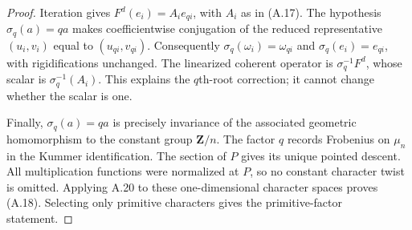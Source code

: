 \documentclass[11pt]{article}
\begin{document}
\begin{proof}
Iteration gives $F^d(e_i)=A_i e_{qi}$, with $A_i$ as in (A.17).
The hypothesis $\sigma_q(a)=qa$ makes coefficientwise conjugation
of the reduced representative $(u_i,v_i)$ equal to $(u_{qi},v_{qi})$.
Consequently $\sigma_q(\omega_i)=\omega_{qi}$ and
$\sigma_q(e_i)=e_{qi}$, with rigidifications unchanged.
The linearized coherent operator is $\sigma_q^{-1}F^d$,
whose scalar is $\sigma_q^{-1}(A_i)$.
This explains the $q$th-root correction; it cannot change whether
the scalar is one.

Finally, $\sigma_q(a)=qa$ is precisely invariance of the associated
geometric homomorphism to the constant group $\mathbf Z/n$.
The factor $q$ records Frobenius on $\mu_n$ in the Kummer
identification. The section of $P$ gives its unique pointed descent.
All multiplication functions were normalized at $P$, so no constant
character twist is omitted. Applying A.20 to these one-dimensional
character spaces proves (A.18). Selecting only primitive characters
gives the primitive-factor statement.
\end{proof}
\end{document}
